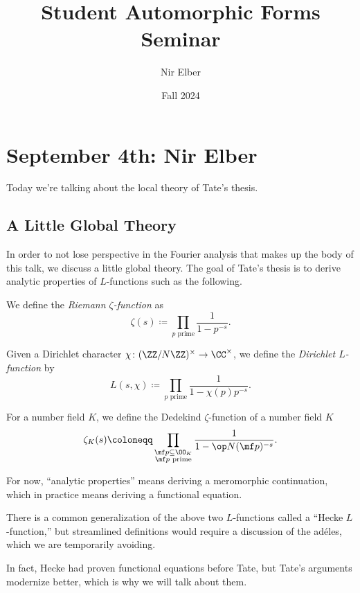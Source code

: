 \documentclass{article}
\title{Student Automorphic Forms Seminar}
\author{Nir Elber}
\date{Fall 2024}
\begin{document}
\maketitle

\tableofcontents

\section{September 4th: Nir Elber}
Today we're talking about the local theory of Tate's thesis.

\subsection{A Little Global Theory}
In order to not lose perspective in the Fourier analysis that makes up the body of this talk, we discuss a little global theory. The goal of Tate's thesis is to derive analytic properties of $L$-functions such as the following.
\begin{definition}
	We define the \textit{Riemann $\zeta$-function} as
	\[\zeta(s)\coloneqq\prod_{p\text{ prime}}\frac1{1-p^{-s}}.\]
\end{definition}
\begin{definition}
	Given a Dirichlet character $\chi\colon(\ZZ/N\ZZ)^\times\to\CC^\times$, we define the \textit{Dirichlet $L$-function} by
	\[L(s,\chi)\coloneqq\prod_{p\text{ prime}}\frac1{1-\chi(p)p^{-s}}.\]
\end{definition}
\begin{definition}
	For a number field $K$, we define the Dedekind $\zeta$-function of a number field $K$
\[\zeta_K(s)\coloneqq\prod_{\substack{\mf p\subseteq\OO_K\\\mf p\text{ prime}}}\frac1{1-\op N(\mf p)^{-s}}.\]
\end{definition}
For now, ``analytic properties'' means deriving a meromorphic continuation, which in practice means deriving a functional equation.
\begin{remark}
	There is a common generalization of the above two $L$-functions called a ``Hecke $L$-function,'' but streamlined definitions would require a discussion of the ad\'eles, which we are temporarily avoiding.
\end{remark}
In fact, Hecke had proven functional equations before Tate, but Tate's arguments modernize better, which is why we will talk about them.
\end{document}
